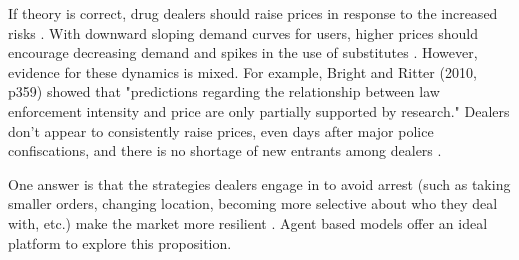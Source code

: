 \documentclass[runningheads,a4paper]{llncs}
\begin{document}




If theory is correct, drug dealers should raise prices in response to the increased risks \cite{reuter_risks_1986}. With downward sloping demand curves for users, higher prices should encourage decreasing demand and spikes in the use of substitutes \cite{mas-colell_microeconomic_1995}. However, evidence for these dynamics is mixed. For example, Bright and Ritter (2010, p359) showed that "predictions regarding the relationship between law enforcement intensity and price are only partially supported by research." Dealers don't appear to consistently raise prices, even days after major police confiscations, and there is no shortage of new entrants among dealers \cite{bouchard_resilience_2007}.


One answer is that the strategies dealers engage in to avoid arrest (such as taking smaller orders, changing location, becoming more selective about who they deal with, etc.) make the market more resilient \cite{bouchard_resilience_2007}. Agent based models offer an ideal platform to explore this proposition.
\end{document}
